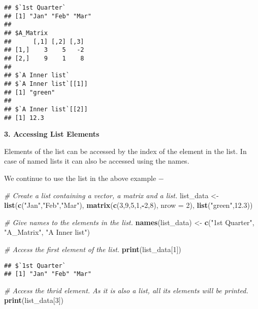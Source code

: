 \documentclass[
]{article}
\newenvironment{Shaded}{\begin{snugshade}}{\end{snugshade}}
\newcommand{\AttributeTok}[1]{\textcolor[rgb]{0.13,0.29,0.53}{#1}}
\newcommand{\CommentTok}[1]{\textcolor[rgb]{0.56,0.35,0.01}{\textit{#1}}}
\newcommand{\DecValTok}[1]{\textcolor[rgb]{0.00,0.00,0.81}{#1}}
\newcommand{\FloatTok}[1]{\textcolor[rgb]{0.00,0.00,0.81}{#1}}
\newcommand{\FunctionTok}[1]{\textcolor[rgb]{0.13,0.29,0.53}{\textbf{#1}}}
\newcommand{\NormalTok}[1]{#1}
\newcommand{\OtherTok}[1]{\textcolor[rgb]{0.56,0.35,0.01}{#1}}
\newcommand{\SpecialCharTok}[1]{\textcolor[rgb]{0.81,0.36,0.00}{\textbf{#1}}}
\newcommand{\StringTok}[1]{\textcolor[rgb]{0.31,0.60,0.02}{#1}}
\begin{document}
\begin{verbatim}
## $`1st Quarter`
## [1] "Jan" "Feb" "Mar"
## 
## $A_Matrix
##      [,1] [,2] [,3]
## [1,]    3    5   -2
## [2,]    9    1    8
## 
## $`A Inner list`
## $`A Inner list`[[1]]
## [1] "green"
## 
## $`A Inner list`[[2]]
## [1] 12.3
\end{verbatim}

\textbf{3. Accessing List Elements}

Elements of the list can be accessed by the index of the element in the
list. In case of named lists it can also be accessed using the names.

We continue to use the list in the above example −

\begin{Shaded}
\begin{Highlighting}[]
\CommentTok{\# Create a list containing a vector, a matrix and a list.}
\NormalTok{list\_data }\OtherTok{\textless{}{-}} \FunctionTok{list}\NormalTok{(}\FunctionTok{c}\NormalTok{(}\StringTok{"Jan"}\NormalTok{,}\StringTok{"Feb"}\NormalTok{,}\StringTok{"Mar"}\NormalTok{), }\FunctionTok{matrix}\NormalTok{(}\FunctionTok{c}\NormalTok{(}\DecValTok{3}\NormalTok{,}\DecValTok{9}\NormalTok{,}\DecValTok{5}\NormalTok{,}\DecValTok{1}\NormalTok{,}\SpecialCharTok{{-}}\DecValTok{2}\NormalTok{,}\DecValTok{8}\NormalTok{), }\AttributeTok{nrow =} \DecValTok{2}\NormalTok{),}
   \FunctionTok{list}\NormalTok{(}\StringTok{"green"}\NormalTok{,}\FloatTok{12.3}\NormalTok{))}

\CommentTok{\# Give names to the elements in the list.}
\FunctionTok{names}\NormalTok{(list\_data) }\OtherTok{\textless{}{-}} \FunctionTok{c}\NormalTok{(}\StringTok{"1st Quarter"}\NormalTok{, }\StringTok{"A\_Matrix"}\NormalTok{, }\StringTok{"A Inner list"}\NormalTok{)}

\CommentTok{\# Access the first element of the list.}
\FunctionTok{print}\NormalTok{(list\_data[}\DecValTok{1}\NormalTok{])}
\end{Highlighting}
\end{Shaded}

\begin{verbatim}
## $`1st Quarter`
## [1] "Jan" "Feb" "Mar"
\end{verbatim}

\begin{Shaded}
\begin{Highlighting}[]
\CommentTok{\# Access the thrid element. As it is also a list, all its elements will be printed.}
\FunctionTok{print}\NormalTok{(list\_data[}\DecValTok{3}\NormalTok{])}
\end{Highlighting}
\end{Shaded}
\end{document}
